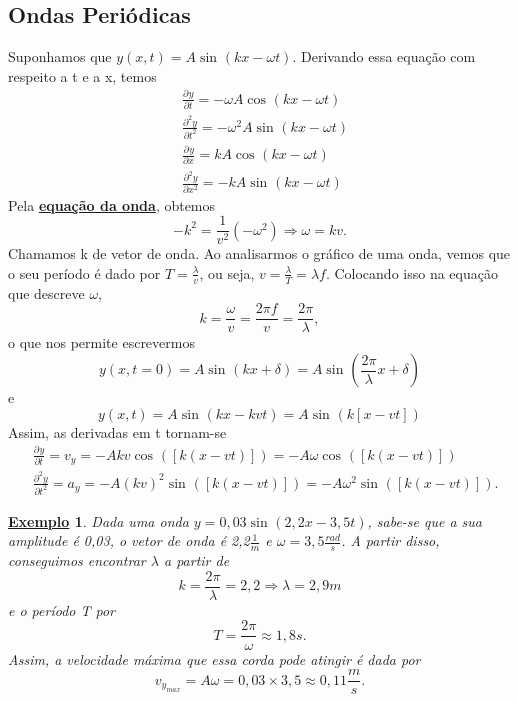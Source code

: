 \documentclass{article}
\newtheorem{example}{\underline{Exemplo}}
\begin{document}
\subsection{Ondas Periódicas}
Suponhamos que \(y(x, t) = A\sin^{}{(kx - \omega t)}\). Derivando essa equação com respeito a t e a x, temos 
\begin{align*}
   &\frac{\partial^{}y}{\partial t^{}} = -\omega A \cos^{}{(kx-\omega t)}\\
   &\frac{\partial^{2}y}{\partial t^{2}} = -\omega^{2}A \sin^{}{(kx-\omega t)}\\
   &\frac{\partial^{}y}{\partial x^{}} = k A \cos^{}{(kx-\omega t)}\\
   &\frac{\partial^{2}y}{\partial x^{2}} = -k A \sin^{}{(kx-\omega t)}
\end{align*}
Pela \hyperlink{wave_eqn}{\textbf{equação da onda}}, obtemos 
\[
  -k^{2} = \frac{1}{v^{2}}(-\omega^{2}) \Rightarrow \omega = kv.
\]
Chamamos k de vetor de onda. Ao analisarmos o gráfico de uma onda, vemos que o seu período
é dado por \(T = \frac{\lambda }{v}\), ou seja, \(v = \frac{\lambda }{T} = \lambda f\). Colocando isso na equação que descreve \(\omega \), 
\[
  k = \frac{\omega }{v} = \frac{2\pi f}{v} = \frac{2\pi }{\lambda },
\]
o que nos permite escrevermos 
\[
  y(x, t=0) = A \sin^{}{(kx + \delta )} = A\sin^{}{(\frac{2\pi }{\lambda }x + \delta )}
\]
e 
\[
  y(x, t) = A \sin^{}{(kx-kvt)} = A\sin^{}{(k[x-vt])}
\]
Assim, as derivadas em t tornam-se 
\begin{align*}
   &\frac{\partial^{}y}{\partial t^{}} = v_{y} = -Akv\cos^{}{([k(x-vt)])} = -A\omega \cos^{}{([k(x-vt)])}\\
   &\frac{\partial^{2}y}{\partial t^{2}} = a_{y} = -A(kv)^{2}\sin^{}{([k(x-vt)])} = -A\omega^{2}\sin^{}{([k(x-vt)])}.
\end{align*}
\begin{example}
  Dada uma onda \(y = 0,03\sin^{}{(2,2x - 3,5t)}\), sabe-se que a sua amplitude é 0,03, o vetor de onda é 2,2\(\frac{1}{m}\) e \(\omega = 3,5\frac{rad}{s}\). A partir disso,
  conseguimos encontrar \(\lambda \) a partir de 
  \[
    k = \frac{2\pi }{\lambda } = 2,2 \Rightarrow \lambda = 2,9m
  \]
  e o período T por 
  \[
    T = \frac{2\pi }{\omega }\approx 1,8s.
  \]
  Assim, a velocidade máxima que essa corda pode atingir é dada por 
  \[
    v_{y_{max}} = A\omega = 0,03\times 3,5\approx 0,11\frac{m}{s}.
  \]
\end{example}
\end{document}
